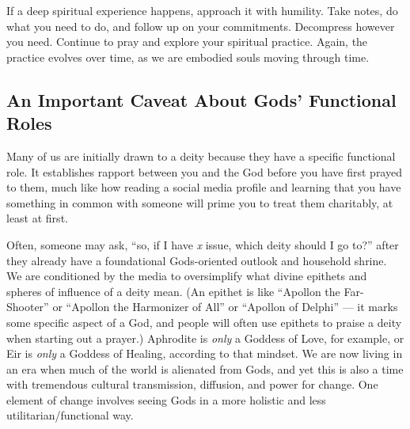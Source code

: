 \documentclass[
]{book}
\begin{document}
If a deep spiritual experience happens, approach it with humility. Take notes, do what you need to do, and follow up on your commitments. Decompress however you need. Continue to pray and explore your spiritual practice. Again, the practice evolves over time, as we are embodied souls moving through time.

\hypertarget{an-important-caveat-about-gods-functional-roles}{%
\subsection{An Important Caveat About Gods' Functional Roles}\label{an-important-caveat-about-gods-functional-roles}}

Many of us are initially drawn to a deity because they have a specific functional role. It establishes rapport between you and the God before you have first prayed to them, much like how reading a social media profile and learning that you have something in common with someone will prime you to treat them charitably, at least at first.

Often, someone may ask, ``so, if I have \emph{x} issue, which deity should I go to?'' after they already have a foundational Gods-oriented outlook and household shrine. We are conditioned by the media to oversimplify what divine epithets and spheres of influence of a deity mean. (An epithet is like ``Apollon the Far-Shooter'' or ``Apollon the Harmonizer of All'' or ``Apollon of Delphi'' --- it marks some specific aspect of a God, and people will often use epithets to praise a deity when starting out a prayer.) Aphrodite is \emph{only} a Goddess of Love, for example, or Eir is \emph{only} a Goddess of Healing, according to that mindset. We are now living in an era when much of the world is alienated from Gods, and yet this is also a time with tremendous cultural transmission, diffusion, and power for change. One element of change involves seeing Gods in a more holistic and less utilitarian/functional way.
\end{document}
